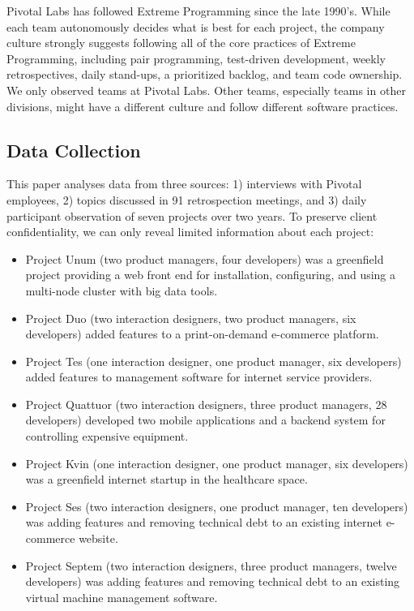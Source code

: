 Pivotal Labs has followed Extreme Programming \cite{BeckExtremeProgramming2004} since the late 1990's. While each team autonomously decides what is best for each project, the company culture strongly suggests following all of the core practices of Extreme Programming, including pair programming, test-driven development, weekly retrospectives, daily stand-ups, a prioritized backlog, and team code ownership. We only observed teams at Pivotal Labs. Other teams, especially teams in other divisions, might have a different culture and follow different software practices.
\subsection{Data Collection}
This paper analyses data from three sources: 1) interviews with Pivotal employees, 2) topics discussed in 91 retrospection meetings, and 3) daily participant observation of seven projects over two years. To preserve client confidentiality, we can only reveal limited information about each project:

\begin{itemize}
\item Project Unum (two product managers, four developers) was a greenfield project providing a web front end for installation, configuring, and using a multi-node cluster with big data tools. 
\item Project Duo (two interaction designers, two product managers, six developers) added features to a print-on-demand e-commerce platform. 
\item Project Tes (one interaction designer, one product manager, six developers) added features to management software for internet service providers.
\item Project Quattuor (two interaction designers, three product managers, 28 developers) developed two mobile applications and a backend system for controlling expensive equipment.
\item Project Kvin (one interaction designer, one product manager, six developers) was a greenfield internet startup in the healthcare space. 
\item Project Ses (two interaction designers, one product manager, ten developers) was adding features and removing technical debt to an existing internet e-commerce website.
\item Project Septem (two interaction designers, three product managers, twelve developers) was adding features and removing technical debt to an existing virtual machine management software.
\end{itemize}
